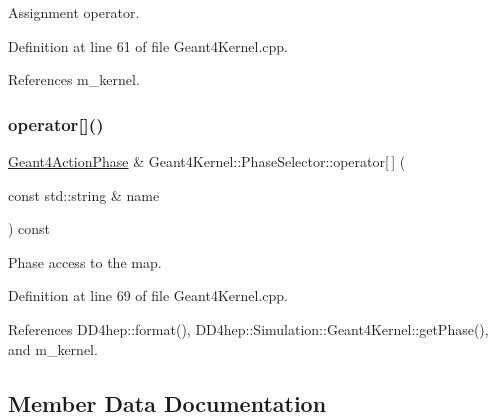 Assignment operator. 



Definition at line 61 of file Geant4\+Kernel.\+cpp.



References m\+\_\+kernel.

\hypertarget{class_d_d4hep_1_1_simulation_1_1_geant4_kernel_1_1_phase_selector_a98b5fd806d172a46e001c0701a4f53c9}{}\label{class_d_d4hep_1_1_simulation_1_1_geant4_kernel_1_1_phase_selector_a98b5fd806d172a46e001c0701a4f53c9} 
\subsubsection{\texorpdfstring{operator[]()}{operator[]()}}
{\footnotesize\ttfamily \hyperlink{class_d_d4hep_1_1_simulation_1_1_geant4_action_phase}{Geant4\+Action\+Phase} \& Geant4\+Kernel\+::\+Phase\+Selector\+::operator\mbox{[}$\,$\mbox{]} (\begin{DoxyParamCaption}\item[{const std\+::string \&}]{name }\end{DoxyParamCaption}) const}



Phase access to the map. 



Definition at line 69 of file Geant4\+Kernel.\+cpp.



References D\+D4hep\+::format(), D\+D4hep\+::\+Simulation\+::\+Geant4\+Kernel\+::get\+Phase(), and m\+\_\+kernel.



\subsection{Member Data Documentation}
\hypertarget{class_d_d4hep_1_1_simulation_1_1_geant4_kernel_1_1_phase_selector_a8f91fcbd0cf2877738f2e227a697d88c}{}\label{class_d_d4hep_1_1_simulation_1_1_geant4_kernel_1_1_phase_selector_a8f91fcbd0cf2877738f2e227a697d88c} 
